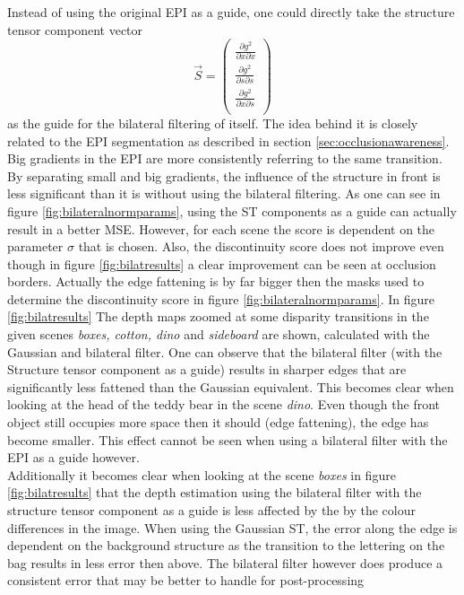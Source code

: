 \documentclass  [
  paper    = a4,
  BCOR     = 10mm,
  twoside,
  fontsize = 12pt,
  fleqn,
  toc      = bibnumbered,
  toc      = listofnumbered,
  numbers  = noendperiod,
  headings = normal,
  listof   = leveldown,
  version  = 3.03
]                                       {scrreprt}
\begin{document}
 Instead of using the original EPI as a guide, one could directly take the structure tensor component vector 
 \begin{equation}\label{key}
 \vec S = \left(\begin{matrix}
 \frac{\partial g^2}{\partial x \partial x} \\
 \frac{\partial g^2}{\partial s \partial s} \\
 \frac{\partial g^2}{\partial x \partial s} \\
 \end{matrix}\right)
 \end{equation}
 as the guide for the bilateral filtering of itself. The idea behind it is closely related to the EPI segmentation as described in section \ref{sec:occlusionawareness}. Big gradients in the EPI are more consistently referring to the same transition. By separating small and big gradients, the influence of the structure in front is less significant than it is without using the bilateral filtering. As one can see in figure \ref{fig:bilateralnormparams}, using the ST components as a guide can actually result in a better MSE. However, for each scene the score is dependent on the parameter $\sigma$ that is chosen. Also, the discontinuity score does not improve even though in figure \ref{fig:bilatresults} a clear improvement can be seen at occlusion borders. Actually the edge fattening is by far bigger then the masks used to determine the discontinuity score in figure \ref{fig:bilateralnormparams}. In figure \ref{fig:bilatresults} The depth maps zoomed at some disparity transitions in the given scenes \textit{boxes, cotton, dino} and \textit{sideboard} are shown, calculated with the Gaussian and bilateral filter. One can observe that the bilateral filter (with the Structure tensor component as a guide) results in sharper edges that are significantly less \glqq fattened \grqq than the Gaussian equivalent. This becomes clear when looking at the head of the teddy bear in the scene \textit{dino}. Even though the front object still occupies more space then it should (edge fattening), the edge has become smaller. This effect cannot be seen when using a bilateral filter with the EPI as a guide however.\\
 Additionally it becomes clear when looking at the scene \textit{boxes} in figure \ref{fig:bilatresults} that the depth estimation using the bilateral filter with the structure tensor component as a guide is less affected by the by the colour differences in the image. When using the Gaussian ST, the error along the edge is dependent on the background structure as the transition to the lettering on the bag results in less error then above. The bilateral filter however does produce a consistent error that may be better to handle for post-processing
\end{document}
